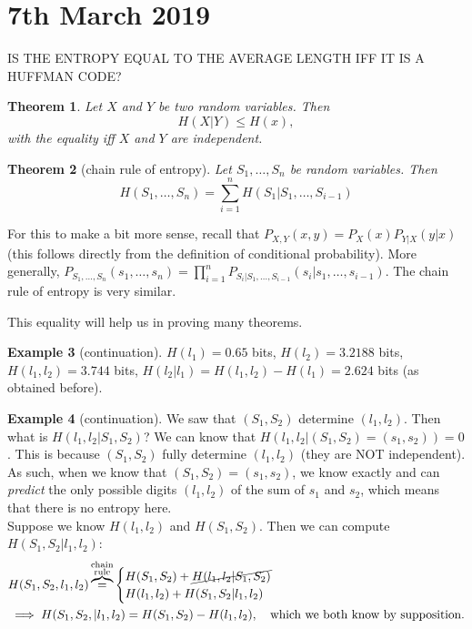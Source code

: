 \documentclass{report}
\theoremstyle{plain}
\newtheorem{thm}{Theorem}
\theoremstyle{definition}
\newtheorem{exmp}[thm]{Example}
\theoremstyle{remark}
\begin{document}
\section{7th March 2019}

IS THE ENTROPY EQUAL TO THE AVERAGE LENGTH IFF IT IS A HUFFMAN CODE?

\begin{thm}
	Let $X$ and $Y$ be two random variables. Then
	\begin{equation}
		H(X|Y) \leq H(x),
	\end{equation}
	with the equality iff $X$ and $Y$ are independent.
\end{thm}

\begin{thm}[chain rule of entropy]
	Let $S_1, \ldots, S_n$ be random variables. Then
	\begin{equation}
		\boxed{H(S_1, \ldots, S_n) = \sum_{i=1}^n H(S_1 | S_1, \ldots, S_{i-1})}
	\end{equation}
\end{thm}

 For this to make a bit more sense, recall that $P_{X, Y}(x, y) = P_X(x)P_{Y|X}(y|x)$ (this follows directly from the definition of conditional probability). More generally, $P_{S_1, \ldots, S_n}(s_1, \ldots, s_n) = \prod_{i=1}^n P_{S_i | S_1, \ldots, S_{i-1}}(s_i | s_1, \ldots, s_{i-1})$. The chain rule of entropy is very similar. \par
 This equality will help us in proving many theorems.
 
 \begin{exmp}[continuation]
 	$H(l_1) = 0.65$ bits, $H(l_2) = 3.2188$ bits, $H(l_1, l_2) = 3.744$ bits, $H(l_2 | l_1) = H(l_1, l_2) - H(l_1) = 2.624$ bits (as obtained before).
 \end{exmp}
 
 \begin{exmp}[continuation]
 	We saw that $(S_1, S_2)$ determine $(l_1, l_2)$. Then what is $H(l_1, l_2 | S_1, S_2)$? We can know that $H(l_1, l_2 | (S_1, S_2) = (s_1, s_2)) = 0$. This is because $(S_1, S_2)$ fully determine $(l_1, l_2)$ (they are NOT independent). As such, when we know that $(S_1, S_2) = (s_1, s_2)$, we know exactly and can \emph{predict} the only possible digits $(l_1, l_2)$ of the sum of $s_1$ and $s_2$, which means that there is no entropy here. \\
 	Suppose we know $H(l_1, l_2)$ and $H(S_1, S_2)$. Then we can compute $H(S_1, S_2 | l_1, l_2)$:
 	\begin{align*}
 		&H(S_1, S_2, l_1, l_2) \overbrace{=}^{\substack{\text{chain} \\ \text{rule}}} \begin{cases} H(S_1, S_2) + \cancel{H(l_1, l_2 | S_1, S_2)} \\
 													  H(l_1, l_2) + H(S_1, S_2 | l_1, l_2)
 													  \end{cases} \\
		&\implies H(S_1, S_2, | l_1, l_2) = H(S_1, S_2) - H(l_1, l_2), \quad \text{which we both know by supposition.}
 	\end{align*}
 \end{exmp}
 
\end{document}
